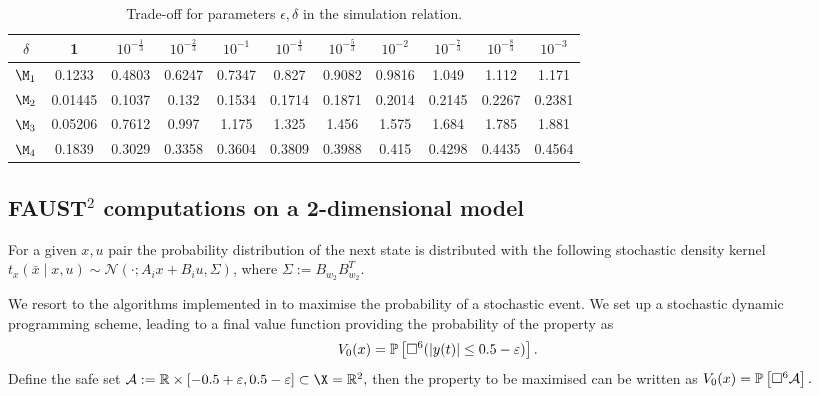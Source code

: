\documentclass[letterpaper, 10 pt, conference]{amsart}
\newcommand{\err}{\varepsilon}
\newcommand{\mc}[1]{\mathcal{#1}}
\theoremstyle{definition}
\theoremstyle{example}
\theoremstyle{remark}
\newcommand{\eps}{\epsilon}
\begin{document}
\begin{table}[htp]
\begin{tabular}{c|cccccccccc}
 $\delta$& 1 &$10^{-\frac{1}{3}}$&$10^{-\frac{2}{3}} $&   $ 10^{-1}$& $10^{-\frac{4}{3}}$ & $10^{-\frac{5}{3}}$ & $ 10^{-2}$&$10^{-\frac{7}{3}}$&$10^{-\frac{8}{3}} $&  $10^{- {3}}$\\ \hline
$\M_1$  \!\!& \small   0.1233  \!\!\!\!& \small   0.4803  \!\!\!\!& \small   0.6247  \!\!\!\!& \small   0.7347  \!\!\!\!& \small    0.827  \!\!\!\!& \small   0.9082  \!\!\!\!& \small   0.9816  \!\!\!\!& \small    1.049  \!\!\!\!& \small    1.112  \!\!\!\!& \small    1.171 \\ 
$\M_2$  \!\!& \small   0.01445  \!\!\!\!& \small   0.1037  \!\!\!\!& \small    0.132  \!\!\!\!& \small   0.1534  \!\!\!\!& \small   0.1714  \!\!\!\!& \small   0.1871  \!\!\!\!& \small   0.2014  \!\!\!\!& \small   0.2145  \!\!\!\!& \small   0.2267  \!\!\!\!& \small   0.2381 \\ 
$\M_3$\!\!& \small  0.05206  \!\!\!\!& \small   0.7612  \!\!\!\!& \small    0.997  \!\!\!\!& \small    1.175  \!\!\!\!& \small    1.325  \!\!\!\!& \small    1.456  \!\!\!\!& \small    1.575  \!\!\!\!& \small    1.684  \!\!\!\!& \small    1.785  \!\!\!\!& \small    1.881 \\ 
$\M_4$ \!\!& \small    0.1839  \!\!\!\!& \small   0.3029  \!\!\!\!& \small   0.3358  \!\!\!\!& \small   0.3604  \!\!\!\!& \small   0.3809  \!\!\!\!& \small   0.3988  \!\!\!\!& \small    0.415  \!\!\!\!& \small   0.4298  \!\!\!\!& \small   0.4435  \!\!\!\!& \small   0.4564  \end{tabular}
\caption{Trade-off for parameters $\eps,\delta$ in the simulation relation.}
\end{table}

\subsection{FAUST$^2$ computations on a 2-dimensional model}
For a given $x,u$ pair the probability distribution of the next state is distributed with the following stochastic density kernel
\(t_x(\bar x\mid x,u)\sim \mc N(\cdot;A_ix+B_i u,\Sigma )\), 
where $\Sigma:=B_{w_2}B_{w_2}^T$.

We resort to the algorithms implemented in \cite{FAUST13} to maximise the probability of a stochastic event. 
We set up a stochastic dynamic programming scheme, leading to a final value function providing the probability of the property as 
    \[V_0(x)=\mathbb P\left[ \always^6(|y(t)|\leq 0.5-\err)\right].\]
Define the safe set
\(\mc A:=\mathbb R \times [-0.5+\err,0.5-\err]\subset\X=\mathbb R^2,\)
then the property to be maximised can be written as
    \(V_0(x)=\mathbb P\left[ \always^6 \mc A\right].\)
\end{document}
